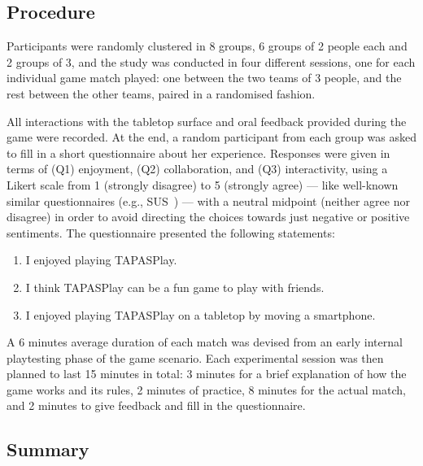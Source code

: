 \subsection{Procedure}\label{sec:procedure}
Participants were randomly clustered in 8 groups, 6 groups of 2 people each and 2 groups of 3, and the study was conducted in four different sessions, one for each individual game match played: one between the two teams of 3 people, and the rest between the other teams, paired in a randomised fashion.

All interactions with the tabletop surface and oral feedback provided during the game were recorded. At the end, a random participant from each group was asked to fill in a short questionnaire about her experience. Responses were given in terms of (Q1) enjoyment, (Q2) collaboration, and (Q3) interactivity, using a Likert scale from 1 (strongly disagree) to 5 (strongly agree) --- like well-known similar questionnaires (e.g., SUS~\cite{brooke1996sus}) --- with a neutral midpoint (neither agree nor disagree) in order to avoid directing the choices towards just negative or positive sentiments. The questionnaire presented the following statements:
\begin{enumerate}[label=Q\arabic*]
  \item I enjoyed playing TAPASPlay.
  \item I think TAPASPlay can be a fun game to play with friends.
  \item I enjoyed playing TAPASPlay on a tabletop by moving a smartphone.
\end{enumerate}

A 6 minutes average duration of each match was devised from an early internal playtesting phase of the game scenario. Each experimental session was then planned to last 15 minutes in total: 3 minutes for a brief explanation of how the game works and its rules, 2 minutes of practice, 8 minutes for the actual match, and 2 minutes to give feedback and fill in the questionnaire.

\subsection{Summary}

